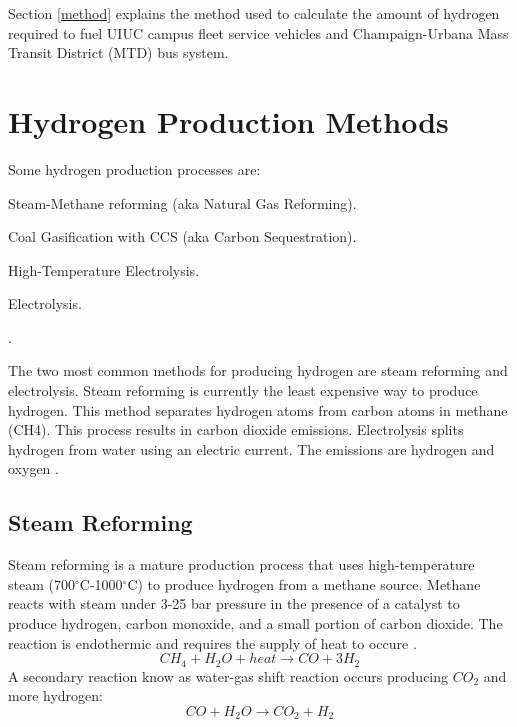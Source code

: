 \documentclass{anstrans}
\begin{document}
Section \ref{method} explains the method used to calculate the amount of hydrogen required to fuel UIUC campus fleet service vehicles and Champaign-Urbana Mass Transit District (MTD) bus system.

\section{Hydrogen Production Methods}
\label{hydroprod}

Some hydrogen production processes are: 
\begin{description}[font=$\bullet$\scshape\bfseries]
	\item[] Steam-Methane reforming (aka Natural Gas Reforming).
	\item[] Coal Gasification with CCS (aka Carbon Sequestration).
	\item[] High-Temperature Electrolysis.
	\item[] Electrolysis.
	\item[] .
\end{description}

The two most common methods for producing hydrogen are steam reforming and electrolysis.
Steam reforming is currently the least expensive way to produce hydrogen. This method separates hydrogen atoms from carbon atoms in methane (CH4). This process results in carbon dioxide emissions.
Electrolysis splits hydrogen from water using an electric current. The emissions are hydrogen and oxygen \cite{noauthor_production_2019}. 

\subsection{Steam Reforming}

Steam reforming is a mature production process that uses high-temperature steam (700$^{\circ}$C-1000$^{\circ}$C) to produce hydrogen from a methane source. Methane reacts with steam under 3-25 bar pressure in the presence of a catalyst to produce hydrogen, carbon monoxide, and a small portion of carbon dioxide. The reaction is endothermic and requires the supply of heat to occure \cite{noauthor_hydrogen_nodate}.
\begin{equation}
CH_4 + H_2O + heat \rightarrow CO + 3H_2
\end{equation}
A secondary reaction know as water-gas shift reaction occurs producing $CO_2$ and more hydrogen:
\begin{equation}
CO + H_2O \rightarrow CO_2 + H_2
\end{equation}
\end{document}
